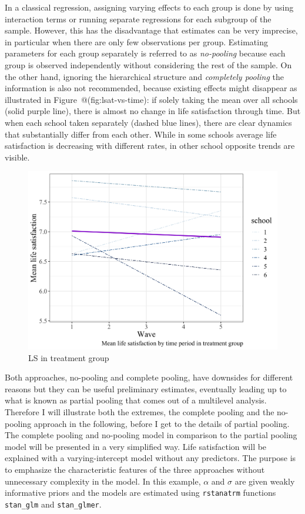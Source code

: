 \documentclass[a4, 12pt]{article}
\begin{document}
In a classical regression, assigning varying effects to each group is done by using interaction terms or running separate regressions for each subgroup of the sample. However, this has the disadvantage that estimates can be very imprecise, in particular when there are only few observations per group. Estimating parameters for each group separately is referred to as \emph{no-pooling} because each group is observed independently without considering the rest of the sample. On the other hand, ignoring the hierarchical structure and \emph{completely pooling} the information is also not recommended, because existing effects might disappear as illustrated in Figure~@(fig:lsat-vs-time): if solely taking the mean over all schools (solid purple line), there is almost no change in life satisfaction through time. But when each school taken separately (dashed blue lines), there are clear dynamics that substantially differ from each other. While in some schools average life satisfaction is decreasing with different rates, in other school opposite trends are visible.

\begin{figure}[H]

{\centering \includegraphics[width=0.8\linewidth,]{../figures/lsat_vs_time_by_school_treated} 

}

\caption{LS in treatment group}\label{fig:lsat-vs-time}
\end{figure}

Both approaches, no-pooling and complete pooling, have downsides for different reasons but they can be useful preliminary estimates, eventually leading up to what is known as partial pooling that comes out of a multilevel analysis. Therefore I will illustrate both the extremes, the complete pooling and the no-pooling approach in the following, before I get to the details of partial pooling. The complete pooling and no-pooling model in comparison to the partial pooling model will be presented in a very simplified way. Life satisfaction will be explained with a varying-intercept model without any predictors. The purpose is to emphasize the characteristic features of the three approaches without unnecessary complexity in the model. In this example, \(\alpha\) and \(\sigma\) are given weakly informative priors and the models are estimated using \texttt{rstanatrm} functions \texttt{stan\_glm} and \texttt{stan\_glmer}.
\end{document}
